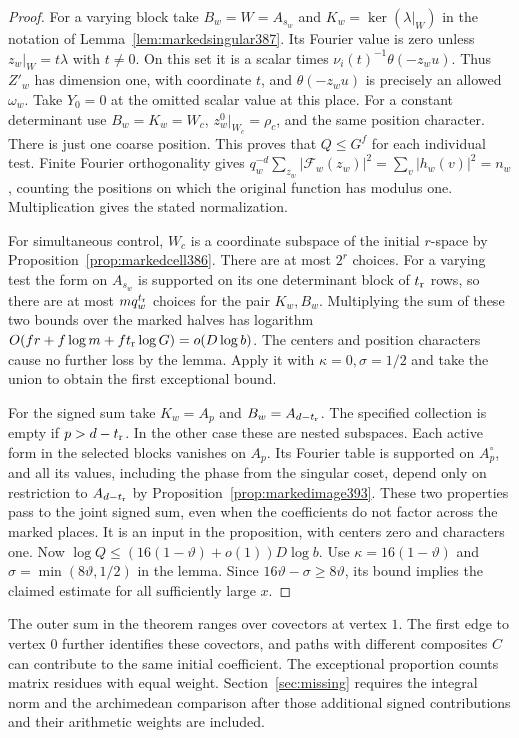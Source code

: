 \documentclass[a4paper,11pt]{article}
\theoremstyle{definition}
\theoremstyle{remark}
\numberwithin{equation}{section}
\begin{document}
\begin{proof}
For a varying block take \(B_w=W=A_{s_w}\) and
\(K_w=\ker(\lambda|_W)\) in the notation of
Lemma~\ref{lem:markedsingular387}. Its Fourier value is zero
unless \(z_w|_W=t\lambda\) with \(t\ne0\). On this set it is
a scalar times \(\nu_i(t)^{-1}\theta(-z_wu)\).
Thus \(Z'_w\) has dimension one, with coordinate \(t\), and
\(\theta(-z_wu)\) is precisely an allowed \(\omega_w\).
Take \(Y_0=0\) at the omitted scalar value at this place.
For a constant determinant use \(B_w=K_w=W_c\),
\(z_w^0|_{W_c}=\rho_c\), and the same position character.
There is just one coarse position. This proves that
\(Q\le G^f\) for each individual test. Finite Fourier
orthogonality gives
\(q_w^{-d}\sum_{z_w}|\mathcal F_w(z_w)|^2
=\sum_v|h_w(v)|^2=n_w\), counting the positions on which the
original function has modulus one. Multiplication gives the
stated normalization.

For simultaneous control, \(W_c\) is a coordinate subspace of
the initial \(r\)-space by Proposition~\ref{prop:markedcell386}.
There are at most \(2^r\) choices. For a varying test the form
on \(A_{s_w}\) is supported on its one determinant block of
\(t_{\rm r}\) rows, so there are at most \(m q_w^{t_{\rm r}}\)
choices for the pair \(K_w,B_w\). Multiplying the sum of
these two bounds over the marked halves has logarithm
\(O(fr+f\log m+ft_{\rm r}\log G)=o(D\log b)\).
The centers and position characters cause no further loss by
the lemma. Apply it with \(\kappa=0,\sigma=1/2\) and take
the union to obtain the first exceptional bound.

For the signed sum take \(K_w=A_p\) and \(B_w=A_{d-t_{\rm r}}\).
The specified collection is empty if \(p>d-t_{\rm r}\).
In the other case these are nested subspaces. Each active form in
the selected blocks vanishes on \(A_p\). Its Fourier table
is supported on \(A_p^\circ\), and all its values, including
the phase from the singular coset, depend only on restriction
to \(A_{d-t_{\rm r}}\) by Proposition~\ref{prop:markedimage393}.
These two properties pass to the joint signed sum, even when
the coefficients do not factor across the marked places.
It is an input in the proposition, with centers zero and
characters one. Now \(\log Q\le(16(1-\vartheta)+o(1))D\log b\).
Use \(\kappa=16(1-\vartheta)\) and
\(\sigma=\min(8\vartheta,1/2)\) in the lemma. Since
\(16\vartheta-\sigma\ge8\vartheta\), its bound implies the
claimed estimate for all sufficiently large \(x\).
\end{proof}

The outer sum in the theorem ranges over covectors at vertex \(1\).
The first edge to vertex \(0\) further identifies these covectors,
and paths with different composites \(C\) can contribute to the
same initial coefficient. The exceptional proportion counts matrix
residues with equal weight. Section~\ref{sec:missing} requires the
integral norm and the archimedean comparison after those additional
signed contributions and their arithmetic weights are included.
\end{document}
